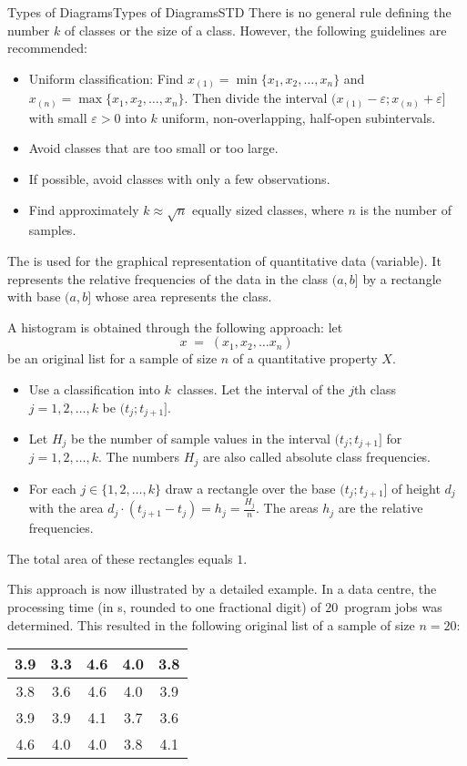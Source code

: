 \begin{MXContent}{Types of Diagrams}{Types of Diagrams}{STD}
There is no general rule defining the number $k$ of classes or the size of a class. However, the following 
guidelines are recommended:
\begin{itemize}
\item{Uniform classification: Find $x_{(1)}=\min\lbrace x_{1},x_{2},\ldots ,x_{n}\rbrace$ and
$x_{(n)}=\max\lbrace x_{1},x_{2},\ldots ,x_{n}\rbrace$. Then divide the interval 
$(x_{(1)}-\varepsilon;x_{(n)}+\varepsilon]$ with small $\varepsilon >0$ into $k$ uniform, non-overlapping, 
half-open subintervals.}
\item{Avoid classes that are too small or too large.}
\item{If possible, avoid classes with only a few observations.}
\item{Find approximately $k\approx \sqrt{n}$ equally sized classes, where $n$ is the number of samples.}
\end{itemize}

\begin{MInfo}
The  is used for the graphical representation of quantitative data (variable). It represents 
the relative frequencies of the data in the class $(a,b]$ by a rectangle with base $(a,b]$ whose area 
represents the class.
\end{MInfo}

A histogram is obtained through the following approach: let 
$$
x\;=\; (x_{1},x_{2},\ldots x_{n})
$$
be an original list for a sample of size $n$ of a quantitative property $X$.
\begin{itemize}
\item{Use a classification into $k$~classes. Let the interval of the $j$th class $j=1,2,\ldots ,k$ be 
$(t_{j};t_{j+1}]$.}
\item{Let $H_{j}$ be the number of sample values in the interval $(t_{j};t_{j+1}]$ for $j=1,2,\ldots ,k$.
The numbers $H_{j}$ are also called absolute class frequencies.}
\item{For each $j\in \{1,2,\ldots ,k\}$ draw a rectangle over the base $(t_{j};t_{j+1}]$ of height 
  $d_{j}$ with the area $d_{j}\cdot (t_{j+1}-t_{j})=h_{j}=\frac{H_{j}}{n}$.  The areas $h_{j}$ are 
  the relative frequencies.}
\end{itemize}

The total area of these rectangles equals $1$. 

This approach is now illustrated by a detailed example. In a data centre, the processing time (in s, rounded 
to one fractional digit) of $20$~program jobs was determined. This resulted in the following original 
list of a sample of size $n=20$:
\begin{center}
\begin{tabular}{|c|c|c|c|c|}
\hline
3.9 & 3.3 & 4.6 & 4.0 & 3.8\\ \hline
3.8 & 3.6 & 4.6 & 4.0 & 3.9\\ \hline
3.9 & 3.9 & 4.1 & 3.7 & 3.6\\ \hline
4.6 & 4.0 & 4.0 & 3.8 & 4.1\\ \hline
\end{tabular}
\end{center}


\end{MXContent}
